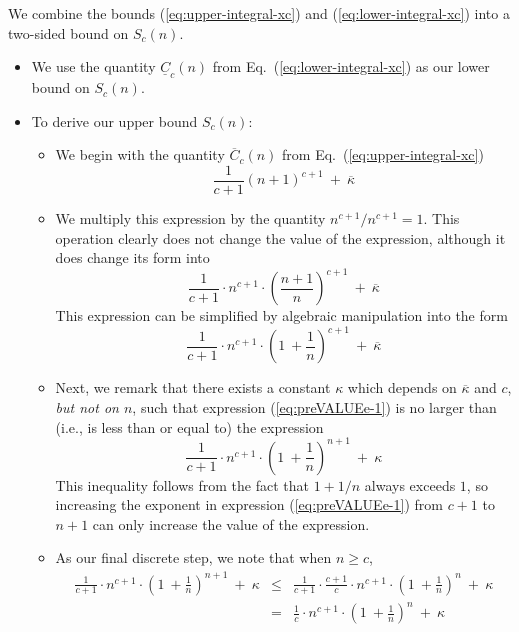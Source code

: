 \noindent
We combine the bounds (\ref{eq:upper-integral-xc}) and (\ref{eq:lower-integral-xc}) into a two-sided bound on $S_c(n)$.
\begin{itemize}
\item
We use the quantity $\underline{C}_c(n)$ from Eq.~(\ref{eq:lower-integral-xc}) as our lower bound on $S_c(n)$.
\medskip\item
To derive our upper bound $S_c(n)$:
  \begin{itemize}
  \item
We begin with the quantity $\overline{C}_c(n)$ from Eq.~(\ref{eq:upper-integral-xc})
\[ \frac{1}{c+1} (n+1)^{c+1} \ + \ \overline{\kappa} \]
  \medskip\item
We multiply this expression by the quantity $n^{c+1}/n^{c+1} = 1$.  This operation clearly does not change the value of the expression, although it does change its form into
\[ \frac{1}{c+1} \cdot n^{c+1} \cdot \left( \frac{n+1}{n} \right)^{c+1}  \ + \ \overline{\kappa} \]
This expression can be simplified by algebraic manipulation into the form
\begin{equation}
\label{eq:preVALUEe-1}
\frac{1}{c+1} \cdot n^{c+1} \cdot \left( 1 \ + \frac{1}{n} \right)^{c+1} \ + \ \overline{\kappa}
\end{equation}

  \medskip\item
Next, we remark that there exists a constant $\kappa$ which depends on $\overline{\kappa}$ and $c$, {\em but not on $n$}, such that expression (\ref{eq:preVALUEe-1}) is no larger than (i.e., is less than or equal to) the expression
\begin{equation}
\label{eq:preVALUEe-2}
\frac{1}{c+1} \cdot n^{c+1} \cdot \left( 1 \ + \frac{1}{n} \right)^{n+1} \ + \ \kappa
\end{equation}
This inequality follows from the fact that $1 + 1/n$ always exceeds $1$, so increasing the exponent in expression (\ref{eq:preVALUEe-1}) from $c+1$ to $n+1$ can only increase the value of the expression.

  \medskip\item
As our final discrete step, we note that when $n \geq c$,
\begin{eqnarray}
\frac{1}{c+1} \cdot n^{c+1} \cdot \left( 1 \ + \frac{1}{n} \right)^{n+1} \ + \ \kappa
\nonumber
    & \leq &
 \frac{1}{c+1} \cdot  \frac{c+1}{c} \cdot n^{c+1} \cdot \left( 1 \ + \frac{1}{n} \right)^n \ + \ \kappa \\
\label{eq:preVALUEe-3}
    & = &
\frac{1}{c} \cdot n^{c+1} \cdot \left( 1 \ + \frac{1}{n} \right)^n \ + \ \kappa 
\end{eqnarray}


\end{itemize}
\end{itemize}
